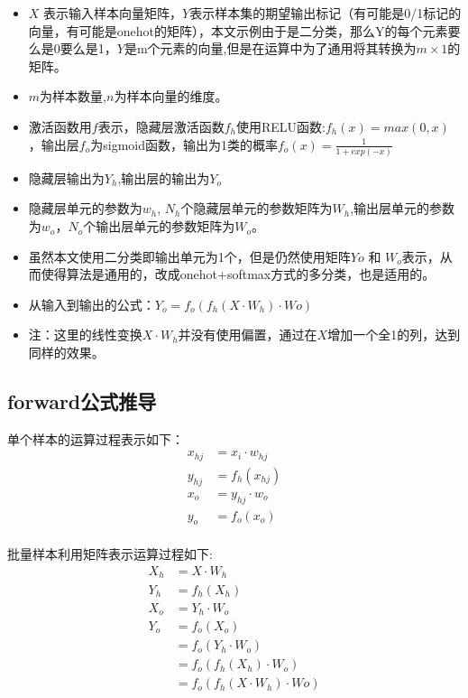 \documentclass[12pt, a4paper, oneside]{ctexart}
\begin{document}
\begin{itemize}
\item $X$ 表示输入样本向量矩阵，$Y$表示样本集的期望输出标记（有可能是0/1标记的向量，有可能是onehot的矩阵），本文示例由于是二分类，那么Y的每个元素要么是0要么是1，$Y$是m个元素的向量,但是在运算中为了通用将其转换为$m\times 1$的矩阵。
\item $m$为样本数量,$n$为样本向量的维度。
\item 激活函数用$f$表示，隐藏层激活函数$f_h$使用RELU函数:$f_h(x) = max(0, x)$，输出层$f_o$为sigmoid函数，输出为1类的概率$f_o(x) = \frac{1}{1+exp(-x)}$
\item 隐藏层输出为$Y_h$,输出层的输出为$Y_o$
\item 隐藏层单元的参数为$w_h$, $N_h$个隐藏层单元的参数矩阵为$W_h$,输出层单元的参数为$w_o$，$N_o$个输出层单元的参数矩阵为$W_o$。
\item 虽然本文使用二分类即输出单元为1个，但是仍然使用矩阵$Yo $ 和 $ W_o$表示，从而使得算法是通用的，改成onehot+softmax方式的多分类，也是适用的。
\item 从输入到输出的公式：$Y_o = f_o(f_h(X \cdot W_h) \cdot Wo)$
\item 注：这里的线性变换$X \cdot W_h$并没有使用偏置，通过在$X$增加一个全1的列，达到同样的效果。
\end{itemize}


\subsection{forward公式推导}
单个样本的运算过程表示如下：
\begin{align*}
    x_{hj} &= x_i \cdot w_{hj} 			\\
	y_{hj} &= f_h(x_{hj}) 				\\
	x_o &= y_{hj} \cdot w_{o} 			\\
	y_{o} &= f_o(x_o) 					\\
\end{align*}

批量样本利用矩阵表示运算过程如下:
\begin{align}
	X_h  &= X \cdot W_h 							\nonumber\\
	Y_h  &= f_h(X_h) 								\nonumber\\
	X_o  &= Y_h \cdot W_o 							\nonumber\\
    Y_o  &= f_o(X_o) 								\nonumber\\
    	 &= f_o(Y_h \cdot W_o) 					    \nonumber\\
    	 &= f_o(f_h(X_h) \cdot W_o) 				\nonumber\\
         &= f_o(f_h(X \cdot W_h) \cdot Wo)          \label{eq1}
\end{align}
\end{document}
